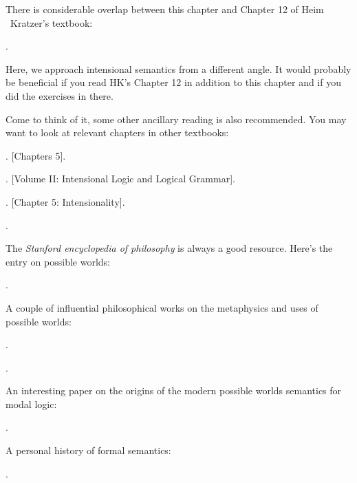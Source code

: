 {\setlength{\parindent}{0pt}\nonzeroparskip

  There is considerable overlap between this chapter and Chapter 12 of
  Heim \amp\ Kratzer's textbook:
\begin{bibentrylist}
	\item {}. 
\end{bibentrylist}

Here, we approach intensional semantics from a different angle. It
would probably be beneficial if you read H\amp K's Chapter 12 in
addition to this chapter and if you did the exercises in there.

Come to think of it, some other ancillary reading is also recommended.
You may want to look at relevant chapters in other textbooks:
\begin{bibentrylist}
	\item {}. [Chapters 5]. 
	\item {}. [Volume II: Intensional Logic and Logical Grammar]. 
	\item
          .
          [Chapter 5: Intensionality]. 
        \item {}.
\end{bibentrylist}

The \emph{Stanford encyclopedia of philosophy} is always a good resource. Here's
the entry on possible worlds:
\begin{bibentrylist}
	\item {}. 
\end{bibentrylist}

A couple of influential philosophical works on the metaphysics and
uses of possible worlds:
\begin{bibentrylist}
	\item {}. 
	\item {}. 
\end{bibentrylist}

An interesting paper on the origins of the modern possible worlds
semantics for modal logic:
\begin{bibentrylist}
	\item {}.
\end{bibentrylist}

A personal history of formal semantics:
\begin{bibentrylist}
	\item {}.
\end{bibentrylist}

}
